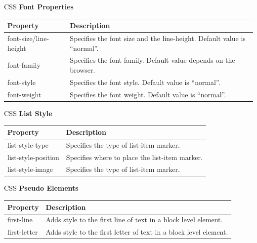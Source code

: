 \documentclass[14pt]{beamer}
\begin{document}
\begin{frame}{CSS}
\textbf{Font Properties}

\vspace{.5pc}

\begin{tabular}{|p{3cm} | p{7cm} |}
\hline
\textbf{Property} & \textbf{Description} \\ \hline
font-size/line-height & Specifies the font size and the line-height. Default value is ``normal''.  \\ \hline
font-family & Specifies the font family. Default value depends on the browser.  \\ \hline
font-style & Specifies the font style. Default value is ``normal''. \\ \hline
font-weight & Specifies the font weight. Default value is ``normal''.  \\ \hline
\end{tabular}
\end{frame}

\begin{frame}{CSS}
\textbf{List Style}

\vspace{1pc}
\begin{tabular}{|p{3cm} | p{7cm} |}
\hline
\textbf{Property} & \textbf{Description} \\ \hline
list-style-type & Specifies the type of list-item marker. \\ \hline
list-style-position & Specifies where to place the list-item marker. \\ \hline
list-style-image & Specifies the type of list-item marker. \\ \hline
\end{tabular}
\end{frame}

\begin{frame}{CSS}
\textbf{Pseudo Elements}

\vspace{.5pc}
 
 \vspace{1pc}
\begin{tabular}{|p{3cm} | p{7cm} |}
\hline
\textbf{Property} & \textbf{Description} \\ \hline
first-line & Adds style to the first line of text in a block level element. \\ \hline
first-letter & Adds style to the first letter of text in a block level element. \\ \hline
\end{tabular}
\end{frame}
\end{document}
